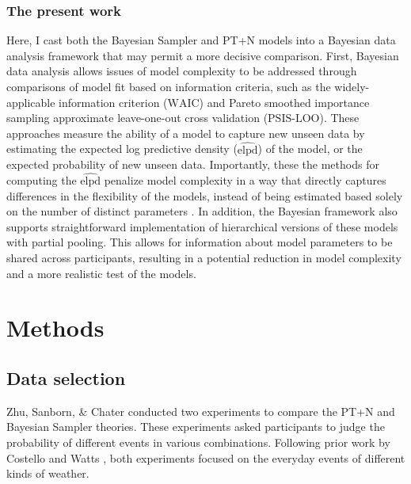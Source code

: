 \documentclass[
  english,
  man,floatsintext]{apa6}
\begin{document}
\hypertarget{the-present-work}{%
\subsubsection{The present work}\label{the-present-work}}

Here, I cast both the Bayesian Sampler and PT+N models into a Bayesian data analysis framework that may permit a more decisive comparison. First, Bayesian data analysis allows issues of model complexity to be addressed through comparisons of model fit based on information criteria, such as the widely-applicable information criterion (\({\text{WAIC}}\)) and Pareto smoothed importance sampling approximate leave-one-out cross validation (\(\text{PSIS-LOO}\)). These approaches measure the ability of a model to capture new unseen data by estimating the expected log predictive density (\(\widehat{\text{elpd}}\)) of the model, or the expected probability of new unseen data. Importantly, these the methods for computing the \(\widehat{\text{elpd}}\) penalize model complexity in a way that directly captures differences in the flexibility of the models, instead of being estimated based solely on the number of distinct parameters \autocite{gelman.etal2014,vehtari.etal2017}. In addition, the Bayesian framework also supports straightforward implementation of hierarchical versions of these models with partial pooling. This allows for information about model parameters to be shared across participants, resulting in a potential reduction in model complexity and a more realistic test of the models.

\hypertarget{methods}{%
\section{Methods}\label{methods}}

\hypertarget{data-selection}{%
\subsection{Data selection}\label{data-selection}}

Zhu, Sanborn, \& Chater \autocite*{chater.etal2020} conducted two experiments to compare the PT+N and Bayesian Sampler theories. These experiments asked participants to judge the probability of different events in various combinations. Following prior work by Costello and Watts \autocites*[e.g.][]{costello.watts2016,costello.watts2018}, both experiments focused on the everyday events of different kinds of weather.
\end{document}
